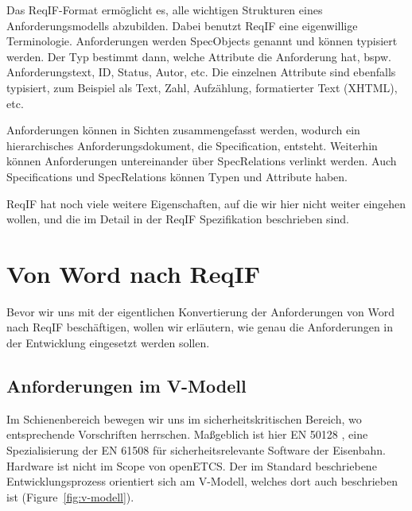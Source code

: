 \documentclass[twoside]{article}
\begin{document}
\begin{multicols}{2}
Das ReqIF-Format ermöglicht es, alle wichtigen Strukturen eines Anforderungsmodells abzubilden.  Dabei benutzt ReqIF eine eigenwillige Terminologie.  Anforderungen werden SpecObjects genannt und können typisiert werden.  Der Typ bestimmt dann, welche Attribute die Anforderung hat, bspw. Anforderungstext, ID, Status, Autor, etc. Die einzelnen Attribute sind ebenfalls typisiert, zum Beispiel als Text, Zahl, Aufzählung, formatierter Text (XHTML), etc.

Anforderungen können in Sichten zusammengefasst werden, wodurch ein hierarchisches Anforderungsdokument, die Specification, entsteht.  Weiterhin können Anforderungen untereinander über SpecRelations verlinkt werden. Auch Specifications und SpecRelations können Typen und Attribute haben.

ReqIF hat noch viele weitere Eigenschaften, auf die wir hier nicht weiter eingehen wollen, und die im Detail in der ReqIF Spezifikation \cite{reqif} beschrieben sind.

\section{Von Word nach ReqIF}

Bevor wir uns mit der eigentlichen Konvertierung der Anforderungen von Word nach ReqIF beschäftigen, wollen wir erläutern, wie genau die Anforderungen in der Entwicklung eingesetzt werden sollen.

\subsection{Anforderungen im V-Modell}

Im Schienenbereich bewegen wir uns im sicherheitskritischen Bereich, wo entsprechende Vorschriften herrschen.  Maßgeblich ist hier EN 50128 \cite{en50128}, eine Spezialisierung der EN 61508 für sicherheitsrelevante Software der Eisenbahn.  Hardware ist nicht im Scope von openETCS.  Der im Standard beschriebene Entwicklungsprozess orientiert sich am V-Modell, welches dort auch beschrieben ist (Figure~\ref{fig:v-modell}). 


\end{multicols}
\end{document}
